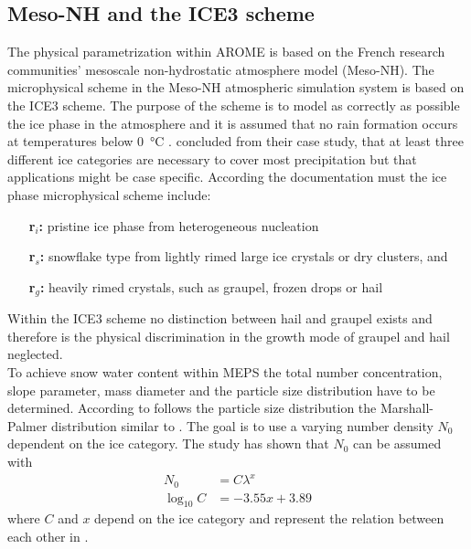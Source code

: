 \subsection{Meso-NH and the ICE3 scheme} \label{sec:MesoNH}
The physical parametrization within AROME is based on the French research communities' mesoscale non-hydrostatic atmosphere model (Meso-NH). The microphysical scheme in the Meso-NH atmospheric simulation system is based on the ICE3 scheme. The purpose of the scheme is to model as correctly as possible the ice phase in the atmosphere and it is assumed that no rain formation occurs at temperatures below \SI{0}{\celsius} \citep{pinty_mixed-phased_1998}. \cite{mccumber_comparison_1991} concluded from their case study, that at least three different ice categories are necessary to cover most precipitation but that applications might be case specific. 
According the \cite{meteo_france_meso-nh_2009} documentation must the ice phase microphysical scheme include: 
\begin{itemize}
	\item [\textbf{r$_i$:}] pristine ice phase from heterogeneous nucleation 
	\item [\textbf{r$_s$:}] snowflake type from lightly rimed large ice crystals or dry clusters, and
	\item [\textbf{r$_g$:}] heavily rimed crystals, such as graupel, frozen drops or hail
\end{itemize}
% 
Within the ICE3 scheme no distinction between hail and graupel exists and therefore is the physical discrimination in the growth mode of graupel and hail neglected. \\
To achieve snow water content within MEPS the total number concentration, slope parameter, mass diameter and  the particle size distribution have to be determined. 
According to \cite{caniaux_numerical_1994} follows the particle size distribution the Marshall-Palmer distribution similar to . The goal is to use a varying number density $N_0$ dependent on the ice category. The study has shown that $N_0$ can be assumed with
\begin{align}
N_0 & = C \lambda^x  \label{eq:model_N0}
\\
\log_{10}C & = -3.55x + 3.89  \nonumber
\end{align}
where $C$ and $x$ depend on the ice category and represent the relation between each other in . 
